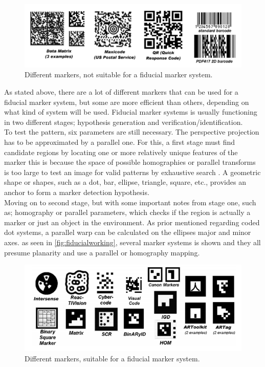 				
					\begin{figure}[H]
						\centering
						\includegraphics[width=0.9\linewidth]{figure/Analysis/fiducialmarkers.png}
						\caption{Different markers, not suitable for a fiducial marker system.}
						\label{fig:fiducialmarkers}
					\end{figure}
					
				
				As stated above, there are a lot of different markers that can be used for a fiducial marker system, but some are more efficient than others, depending on what kind of system will be used.
				Fiducial marker systems is usually functioning in two different stages; hypothesis generation and verification/identification.\\
				
				To test the pattern, six parameters are still necessary. The perspective projection has to be approximated by a parallel one. For this, a first stage must find candidate regions by locating one or more relatively unique features of the marker this is because the space of possible homographies or parallel transforms is too large to test an image for valid patterns by exhaustive search \cite{fiducialMarkers}.
				A geometric shape or shapes, such as a dot, bar, ellipse, triangle, square, etc., provides an anchor to form a marker detection hypothesis.\\
				
				Moving on to second stage, but with some important notes from stage one, such as; homography or parallel parameters, which checks if the region is actually a marker or just an object in the environment. As prior mentioned regarding coded dot systems, a parallel warp can be calculated on the ellipses major and minor axes.
				as seen in \autoref{fig:fiducialworking}, several marker systems is shown and they all presume planarity and use a parallel or homography mapping.
				
					\begin{figure}[H]
						\centering
						\includegraphics[width=0.9\linewidth]{figure/Analysis/fiducialworking.png}
						\caption{Different markers, suitable for a fiducial marker system.}
						\label{fig:fiducialworking}
					\end{figure}
					
